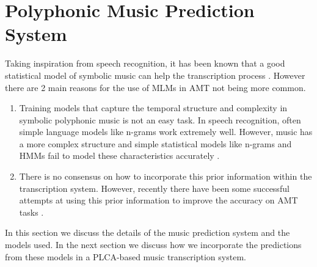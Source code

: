 \section{Polyphonic Music Prediction System} 
\label{sec:prediction}
Taking inspiration from speech recognition, it has been known that a good statistical model of symbolic music can help the transcription process \cite{Cemgil2004a}. However there are 2 main reasons for the use of MLMs in AMT not being more common. 
\begin{enumerate}
\item Training models that capture the temporal structure and complexity in symbolic polyphonic music is not an easy task. In speech recognition, often simple language models like n-grams work extremely well. However, music has a more complex structure and simple statistical models like n-grams and HMMs fail to model these characteristics accurately \cite{Boulanger-Lewandowski2012}.
\item There is no consensus on how to incorporate this prior information within the transcription system. However, recently there have been some successful attempts at using this prior information to improve the accuracy on AMT tasks \cite{Boulanger-Lewandowski2012,Boulanger-Lewandowski2013}. 

\end{enumerate}


In this section we discuss the details of the music prediction system and the models used. In the next section we discuss how we incorporate the predictions from these models in a PLCA-based music transcription system. 


